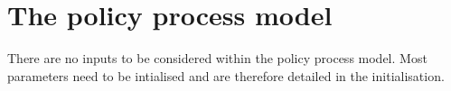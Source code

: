 \section{The policy process model}
\label{sec:InputsPolicy}

There are no inputs to be considered within the policy process model. Most parameters need to be intialised and are therefore detailed in the initialisation.